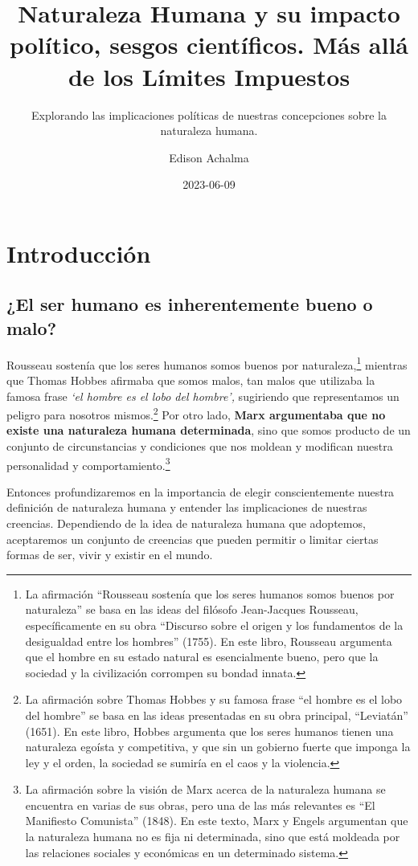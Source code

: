 \documentclass[
  a4paper,
]{article}
\title{Naturaleza Humana y su impacto político, sesgos científicos. Más
allá de los Límites Impuestos}
\subtitle{Explorando las implicaciones políticas de nuestras
concepciones sobre la naturaleza humana.}
\author{Edison Achalma}
\date{2023-06-09}
\begin{document}
\maketitle


\section{Introducción}\label{introducciuxf3n}

\subsection{¿El ser humano es inherentemente bueno o
malo?}\label{el-ser-humano-es-inherentemente-bueno-o-malo}

Rousseau sostenía que los seres humanos somos buenos por
naturaleza,\footnote{La afirmación ``Rousseau sostenía que los seres
  humanos somos buenos por naturaleza'' se basa en las ideas del
  filósofo Jean-Jacques Rousseau, específicamente en su obra ``Discurso
  sobre el origen y los fundamentos de la desigualdad entre los
  hombres'' (1755). En este libro, Rousseau argumenta que el hombre en
  su estado natural es esencialmente bueno, pero que la sociedad y la
  civilización corrompen su bondad innata.} mientras que Thomas Hobbes
afirmaba que somos malos, tan malos que utilizaba la famosa frase
\emph{`el hombre es el lobo del hombre',} sugiriendo que representamos
un peligro para nosotros mismos.\footnote{La afirmación sobre Thomas
  Hobbes y su famosa frase ``el hombre es el lobo del hombre'' se basa
  en las ideas presentadas en su obra principal, ``Leviatán'' (1651). En
  este libro, Hobbes argumenta que los seres humanos tienen una
  naturaleza egoísta y competitiva, y que sin un gobierno fuerte que
  imponga la ley y el orden, la sociedad se sumiría en el caos y la
  violencia.} Por otro lado, \textbf{Marx argumentaba que no existe una
naturaleza humana determinada}, sino que somos producto de un conjunto
de circunstancias y condiciones que nos moldean y modifican nuestra
personalidad y comportamiento.\footnote{La afirmación sobre la visión de
  Marx acerca de la naturaleza humana se encuentra en varias de sus
  obras, pero una de las más relevantes es ``El Manifiesto Comunista''
  (1848). En este texto, Marx y Engels argumentan que la naturaleza
  humana no es fija ni determinada, sino que está moldeada por las
  relaciones sociales y económicas en un determinado sistema.}

Entonces profundizaremos en la importancia de elegir conscientemente
nuestra definición de naturaleza humana y entender las implicaciones de
nuestras creencias. Dependiendo de la idea de naturaleza humana que
adoptemos, aceptaremos un conjunto de creencias que pueden permitir o
limitar ciertas formas de ser, vivir y existir en el mundo.
\end{document}
